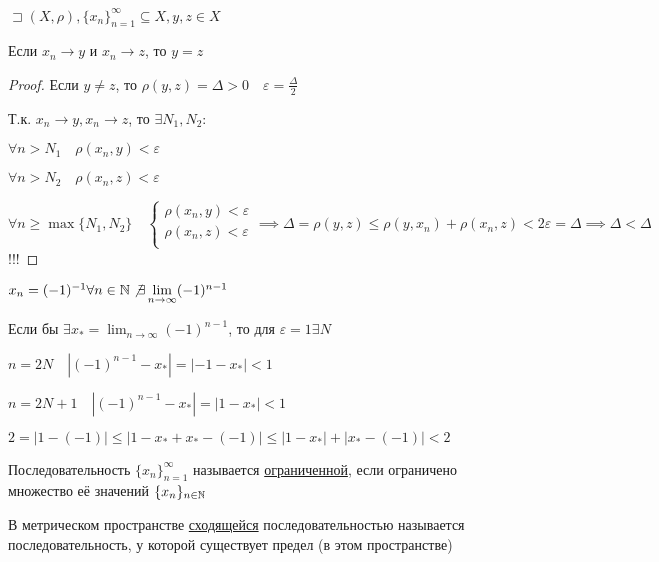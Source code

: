     \begin{statement}

        $\sqsupset (X, \rho), \{x_n\}_{n=1}^{\infty }\subseteq X, y, z\in X $

        Если $x_n\to y$ и $x_n\to z$, то $y=z$
    \end{statement}
    \begin{proof}
        Если $y\neq z$, то $\rho(y,z) = \Delta>0\quad \varepsilon = \frac{\Delta}{2}$

        Т.к. $x_n \to y, x_{n} \to z$, то $\exists N_1, N_2:$

        $\forall n>N_1\quad \rho(x_n,y)<\varepsilon$

        $\forall n>N_2\quad \rho(x_n,z)<\varepsilon$

        $\forall n\geqslant \max\{N_1, N_2\}\quad \begin{cases}
            \rho(x_{n} , y)<\varepsilon \\
            \rho(x_{n} , z)<\varepsilon\\
        \end{cases} \implies  \Delta = \rho(y,z) \leqslant  \rho(y, x_{n}) + \rho(x_{n} , z)<2\varepsilon = \Delta \implies \Delta<\Delta $ !!!
    \end{proof}
    \begin{example}
        $x_n = (-1)^{-1} \forall n\in \N  \not\exists \lim_{n \to \infty} (-1)^{n-1}$

        Если бы $\exists x_* = \lim_{n \to \infty} (-1)^{n-1}$, то для $\varepsilon = 1 \exists N$

        $n=2N\quad \left| (-1)^{n-1} - x_* \right| = |-1-x_*|<1 $

        $n=2N+1\quad \left| (-1)^{n-1} - x_* \right| = |1-x_*|<1 $

    $2 = |1 - (-1)|\leqslant |1-x_* + x_*-(-1)| \leqslant |1-x_*| + |x_* - (-1)| <2$
    \end{example}

    \begin{definition}
        Последовательность $\{x_n\}_{n=1}^{\infty }$ называется \underline{ограниченной}, если ограничено множество её значений $\{x_n\}_{n\in \mathbb{N} }$ 
    \end{definition}

    \begin{definition}
        В метрическом пространстве \underline{сходящейся} последовательностью называется последовательность, у которой существует предел (в этом пространстве)
    \end{definition}

